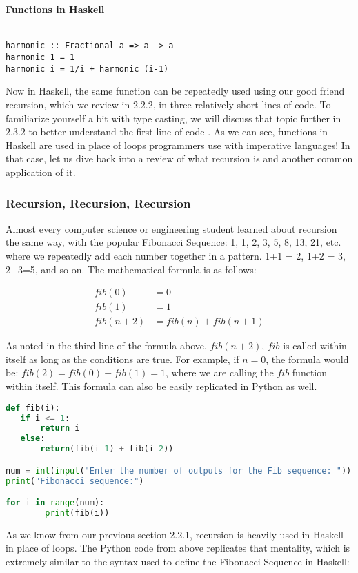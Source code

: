 \documentclass{article}
\begin{document}
\paragraph{Functions in Haskell}
\begin{lstlisting}

harmonic :: Fractional a => a -> a 
harmonic 1 = 1 
harmonic i = 1/i + harmonic (i-1)
\end{lstlisting}

\noindent
Now in Haskell, the same function can be repeatedly used using our good friend recursion, which we review in 2.2.2, in three relatively short lines of code. To familiarize yourself a bit with type casting, we will discuss that topic further in 2.3.2 to better understand the first line of code \cite{Haskell.org Fractional}. As we can see, functions in Haskell are used in place of loops programmers use with imperative languages! In that case, let us dive back into a review of what recursion is and another common application of it.

\subsubsection{Recursion, Recursion, Recursion}
Almost every computer science or engineering student learned about recursion the same way, with the popular Fibonacci Sequence: 1, 1, 2, 3, 5, 8, 13, 21, etc. where we repeatedly add each number together in a pattern. 1+1 = 2, 1+2 = 3, 2+3=5, and so on. The mathematical formula is as follows:

\begin{align}
fib(0) & = 0\\
fib(1) & = 1\\
fib(n+2) & = fib(n) + fib(n+1)
\end{align}

\noindent
As noted in the third line of the formula above, $fib(n+2)$, $fib$ is called within itself as long as the conditions are true. For example, if $n = 0$, the formula would be: $fib(2) = fib(0) + fib(1) = 1$, where we are calling the $fib$ function within itself.
This formula can also be easily replicated in Python as well.

\begin{lstlisting}[language=Python]
def fib(i):
   if i <= 1:
       return i
   else:
       return(fib(i-1) + fib(i-2))

num = int(input("Enter the number of outputs for the Fib sequence: "))
print("Fibonacci sequence:")

for i in range(num):
        print(fib(i))
\end{lstlisting}
\noindent
As we know from our previous section 2.2.1, recursion is heavily used in Haskell in place of loops. The Python code from above replicates that mentality, which is extremely similar to the syntax used to define the Fibonacci Sequence in Haskell:
\end{document}
